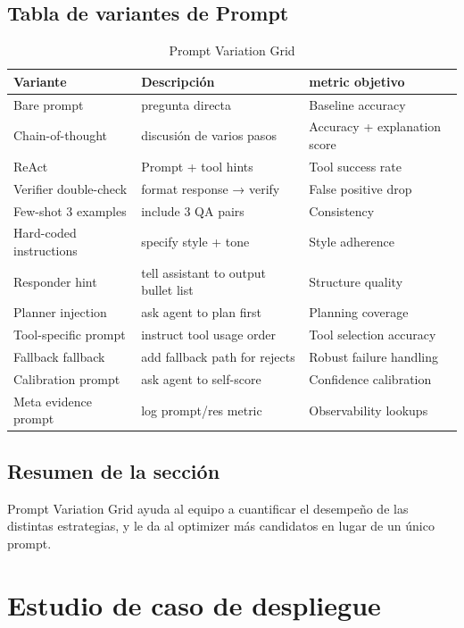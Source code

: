 \documentclass[a4paper]{article}
\begin{document}
\subsection{Tabla de variantes de Prompt}

\begin{table}[H]
\centering
\caption{Prompt Variation Grid}
\begin{tabular}{p{}p{}p{}}
\toprule
Variante & Descripción & metric objetivo \\
\midrule
Bare prompt & pregunta directa & Baseline accuracy \\
Chain-of-thought & discusión de varios pasos & Accuracy + explanation score \\
ReAct & Prompt + tool hints & Tool success rate \\
Verifier double-check & format response → verify & False positive drop \\
Few-shot 3 examples & include 3 QA pairs & Consistency \\
Hard-coded instructions & specify style + tone & Style adherence \\
Responder hint & tell assistant to output bullet list & Structure quality \\
Planner injection & ask agent to plan first & Planning coverage \\
Tool-specific prompt & instruct tool usage order & Tool selection accuracy \\
Fallback fallback & add fallback path for rejects & Robust failure handling \\
Calibration prompt & ask agent to self-score & Confidence calibration \\
Meta evidence prompt & log prompt/res metric & Observability lookups \\
\bottomrule
\end{tabular}
\end{table}

\subsection{Resumen de la sección}

Prompt Variation Grid ayuda al equipo a cuantificar el desempeño de las distintas estrategias, y le da al optimizer más candidatos en lugar de un único prompt.

\section{Estudio de caso de despliegue}
\end{document}

